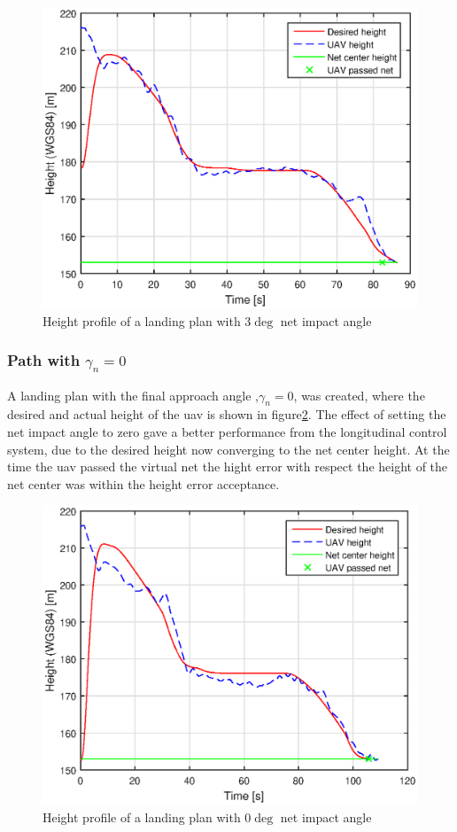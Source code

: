 \begin{figure}[H]
\centering
		\includegraphics[scale=0.7]{figs/Experiment/Height31mai103029.eps}
		\caption{Height profile of a landing plan with $3 \deg$ net impact angle}
		\label{Fig:Height31mai103029}
\end{figure}

\subsubsection{Path with $\gamma_n = 0$}
A landing plan with the final approach angle ,$\gamma_n = 0$, was created, where the desired and actual height of the \gls{uav} is shown in figure\ref{Fig:Height31mai31mai105034}. The effect of setting the net impact angle to zero gave a better performance from the longitudinal control system, due to the desired height now converging to the net center height. At the time the \gls{uav} passed the virtual net the hight error with respect the height of the net center was within the height error acceptance.
\begin{figure}[H]
\centering
		\includegraphics[scale=0.7]{figs/Experiment/Height31mai105034.eps}
		\caption{Height profile of a landing plan with $0 \deg$ net impact angle}
		\label{Fig:Height31mai31mai105034}
\end{figure}

